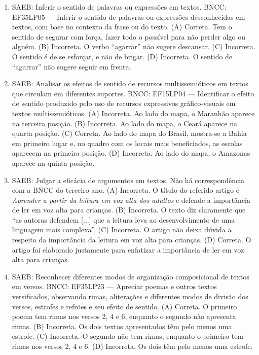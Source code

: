 \begin{enumerate}
\item
SAEB: Inferir o sentido de palavras ou expressões em textos. 
BNCC: EF35LP05 --- Inferir o sentido de palavras ou expressões desconhecidas em textos, com base no contexto da frase ou do texto. 
(A) Correta. Tem o sentido de segurar com força, fazer todo o possível 
para não perder algo ou alguém.
(B) Incorreta. O verbo ``agarrar'' não sugere descansar. 
(C) Incorreta. O sentido é de se esforçar, e não de brigar. 
(D) Incorreta. O sentido de ``agarrar'' não sugere seguir em frente.

\item
SAEB: Analisar os efeitos de sentido de recursos multissemióticos em textos que circulam em diferentes suportes. 
BNCC: EF15LP04 --- Identificar o efeito de sentido produzido pelo uso de recursos expressivos gráfico-visuais em textos multissemióticos. 
(A) Incorreta. Ao lado do mapa, o Maranhão aparece na terceira posição. 
(B) Incorreta. Ao lado do mapa, o Ceará aparece na quarta posição. 
(C) Correta. Ao lado do mapa do Brasil, mostra-se a Bahia em primeiro lugar e, no quadro com os locais mais beneficiados, as escolas aparecem na primeira posição. 
(D) Incorreta. Ao lado do mapa, o Amazonas aparece na quinta posição.

\item
SAEB: Julgar a eficácia de argumentos em textos. Não há correspondência com a BNCC do terceiro ano. 
(A) Incorreta. O título do referido artigo é \textit{Aprender a partir da leitura em voz alta dos adultos} e defende a importância de ler em voz alta para crianças. 
(B) Incorreta. O texto diz claramente que ``as autoras defendem {[}...{]} que a leitura leva ao desenvolvimento de uma linguagem mais complexa''. 
(C) Incorreta. O artigo não deixa dúvida a respeito da importância da leitura em voz alta para crianças. 
(D) Correta. O artigo foi elaborado justamente para enfatizar a importância de ler em voz alta para crianças.

\item
SAEB: Reconhecer diferentes modos de organização composicional de textos em versos. BNCC: EF35LP23 --- Apreciar poemas e outros textos versificados, observando rimas, aliterações e diferentes modos de divisão dos versos, estrofes e refrões e seu efeito de sentido. 
(A) Correta. O primeiro poema tem rimas nos versos 2, 4 e 6, enquanto o segundo não apresenta rimas. 
(B) Incorreta. Os dois textos apresentados têm pelo menos uma estrofe. 
(C) Incorreta. O segundo não tem rimas, enquanto o primeiro tem rimas nos versos 2, 4 e 6. 
(D) Incorreta. Os dois têm pelo menos uma estrofe.


\end{enumerate}

